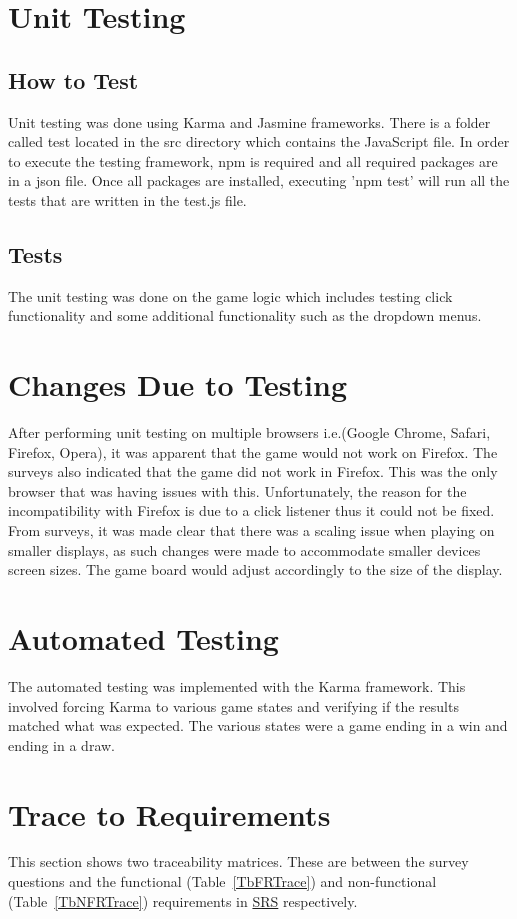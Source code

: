 \documentclass[12pt, titlepage]{article}
\begin{document}
\section{Unit Testing}
\subsection{How to Test}
Unit testing was done using Karma and Jasmine frameworks. There is a folder called test
located in the src directory which contains the JavaScript file. In order to execute the testing framework, 
npm is required and all required packages are in a json file. Once all packages are installed, 
executing 'npm test' will run all the tests that are written in the test.js file.
\subsection{Tests}
The unit testing was done on the game logic which includes testing click functionality and some additional functionality such as the dropdown menus.
\section{Changes Due to Testing} \label{ChangesAfterTesting}
After performing unit testing on multiple browsers i.e.(Google Chrome, Safari, Firefox, Opera),
it was apparent that the game would not work on Firefox. The surveys also indicated that the game did
not work in Firefox. This was the only browser that was having issues with this. Unfortunately,
the reason for the incompatibility with Firefox is due to a click listener thus it could not be fixed. From
surveys, it was made clear that there was a scaling issue when playing on smaller displays, as such
changes were made to accommodate smaller devices screen sizes. The game board would adjust 
accordingly to the size of the display. 
\section{Automated Testing}
The automated testing was implemented with the Karma framework. This involved forcing Karma
to various game states and verifying if the results matched what was expected. The various 
states were a game ending in a win and ending in a draw.

\section{Trace to Requirements}
This section shows two traceability matrices. These are between the survey questions and the functional (Table~\ref{TbFRTrace}) and non-functional (Table~\ref{TbNFRTrace}) requirements in \href{run:../SRS/SRS.pdf}{SRS} respectively.
\end{document}
